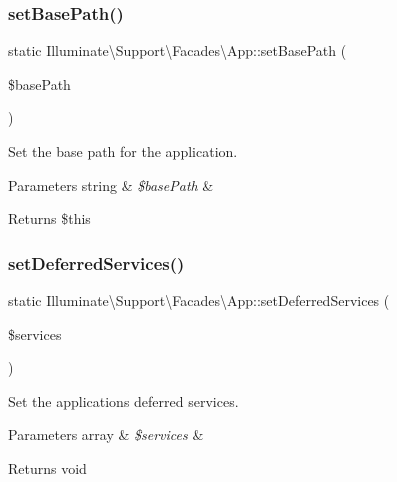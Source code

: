 \subsubsection{\texorpdfstring{set\+Base\+Path()}{setBasePath()}}
{\footnotesize\ttfamily static Illuminate\textbackslash{}\+Support\textbackslash{}\+Facades\textbackslash{}\+App\+::set\+Base\+Path (\begin{DoxyParamCaption}\item[{}]{\$base\+Path }\end{DoxyParamCaption})\hspace{0.3cm}{\ttfamily [static]}}

Set the base path for the application.


\begin{DoxyParams}[1]{Parameters}
string & {\em \$base\+Path} & \\
\hline
\end{DoxyParams}
\begin{DoxyReturn}{Returns}
\$this 
\end{DoxyReturn}
\mbox{\label{class_illuminate_1_1_support_1_1_facades_1_1_app_ac74a1a0bfe5c595e1714f344bbc3c410}} 
\subsubsection{\texorpdfstring{set\+Deferred\+Services()}{setDeferredServices()}}
{\footnotesize\ttfamily static Illuminate\textbackslash{}\+Support\textbackslash{}\+Facades\textbackslash{}\+App\+::set\+Deferred\+Services (\begin{DoxyParamCaption}\item[{}]{\$services }\end{DoxyParamCaption})\hspace{0.3cm}{\ttfamily [static]}}

Set the application\textquotesingle{}s deferred services.


\begin{DoxyParams}[1]{Parameters}
array & {\em \$services} & \\
\hline
\end{DoxyParams}
\begin{DoxyReturn}{Returns}
void 
\end{DoxyReturn}
\mbox{\label{class_illuminate_1_1_support_1_1_facades_1_1_app_a175fcd9533e4df56e2b8bb161e7d3c4a}} 
